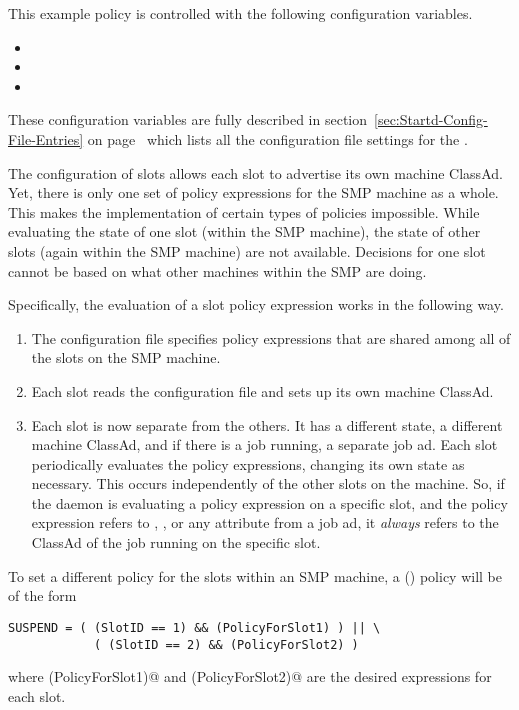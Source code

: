 This example policy is
controlled with the following configuration variables.
\begin{itemize}
\item {}
\item {}
\item {}
\end{itemize}

These configuration variables are fully described in
section~\ref{sec:Startd-Config-File-Entries} on
page~\pageref{sec:Startd-Config-File-Entries} which lists all the
configuration file settings for the .

The configuration of slots allows each slot to advertise
its own machine ClassAd.
Yet, there is only one set of policy expressions for the SMP
machine as a whole.
This makes the implementation of certain types of policies impossible.
While evaluating the state of one slot (within the SMP machine),
the state of other slots (again within the SMP machine) are not
available.
Decisions for one slot cannot be based on what other machines within the SMP
are doing.

Specifically, the evaluation of a slot policy expression works in
the following way.
\begin{enumerate}
\item 
The configuration file specifies policy expressions that are shared among
all of the slots on the SMP machine.
\item 
Each slot reads the configuration file and sets up its own machine ClassAd.
\item 
Each slot is now separate from the others.  It has a
different state, a different machine ClassAd, and if there is a job
running, a separate job ad.
Each slot periodically
evaluates the policy expressions, changing its own state
as necessary.
This occurs independently of the other slots on the machine.
So, if the  daemon is evaluating a policy expression
on a specific slot,
and the policy expression refers to , ,
or any attribute from a job ad,
it \emph{always} refers to the ClassAd of the
job running on the specific slot.
\end{enumerate}

To set a different policy for the slots within an SMP machine,
a (\verb@SUSPEND@) policy will be of the form
\begin{verbatim}
SUSPEND = ( (SlotID == 1) && (PolicyForSlot1) ) || \
            ( (SlotID == 2) && (PolicyForSlot2) )
\end{verbatim}
where \verb@(PolicyForSlot1)@ and \verb@(PolicyForSlot2)@ are the
desired expressions for each slot.

